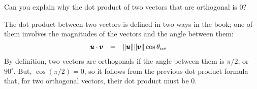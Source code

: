 \documentclass[solutions.tex]{subfiles}
\begin{document}
\maketitle
\begin{exercise} Can you explain why the dot product of
two vectors that are orthogonal is $0$?
\end{exercise}
The dot product between two vectors is defined in two ways
in the book; one of them involves the magnitudes of the vectors
and the angle between them:
\begin{equation*} \begin{aligned}
	\pmb{u}\cdot\pmb{v} &&=\quad& \lVert \pmb{u} \rVert\lVert \pmb{v} \rVert\cos\theta_{uv}
\end{aligned} \end{equation*}
By definition, two vectors are orthogonals if the angle between
them is $\pi/2$, or $90^\circ$. But, $\cos(\pi/2) = 0$, so it follows
from the previous dot product formula that, for two orthogonal
vectors, their dot product must be $0$.
\end{document}
